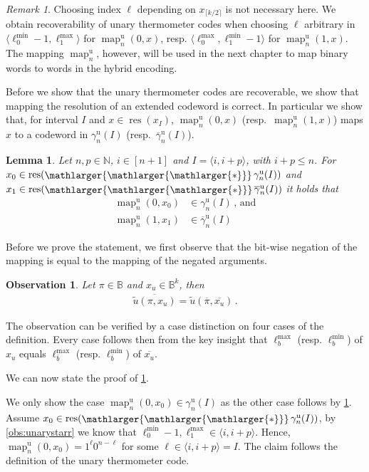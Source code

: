 \documentclass[9pt,journal,compsoc]{IEEEtran}
\newtheorem{lemma}[theorem]{Lemma}
\newtheorem{observation}[theorem]{Observation}
\theoremstyle{remark}
\newtheorem*{remark}{Remark}
\DeclareMathOperator{\res}{res}
\DeclareMathOperator{\map}{map}
\newcommand{\bigstarr}{\mathop{\raisebox{-.7pt}{\ensuremath{\mathlarger{\mathlarger{\mathlarger{*}}}}}}}
\newcommand{\IN}{\mathbb{N}}
\newcommand{\IB}{\mathbb{B}}
\newcommand{\ceil}[1]{\lceil{#1}\rceil}
\newcommand{\ang}[1]{\langle{#1}\rangle}
\newcommand{\intvl}[1]{\ang{#1}}
\newcommand{\gUnary}[1]{\gamma_{#1}^{\operatorname{u}}}
\newcommand{\gbUnary}[1]{\overline{\gamma}_{#1}^{\operatorname{u}}}
\newcommand{\mUnary}[1]{\map_{#1}^{\operatorname{u}}}
\newcommand{\lmax}[1]{\ell^{\max}_{#1}}
\newcommand{\lmin}[1]{\ell^{\min}_{#1}}
\begin{document}
\begin{remark}
  Choosing index $\ell$ depending on $x_{\ceil{k/2}}$ is not necessary here.
  We obtain recoverability of unary thermometer codes when choosing
    $\ell$ arbitrary in $\intvl{\lmin{0}-1,\lmax{1}}$ for $\mUnary{n}(0,x)$,
    resp. $\intvl{\lmax{0},\lmin{1}-1}$ for $\mUnary{n}(1,x)$.
  The mapping $\mUnary{n}$, however, will be used in the next chapter to map
    binary words to words in the hybrid encoding.
\end{remark}

Before we show that the unary thermometer codes are recoverable, 
  we show that mapping the resolution of an extended codeword is correct.
In particular we show that, for interval $I$ and $x\in\res(x_I)$, $\mUnary{n}(0,x)$ 
  (resp.\ $\mUnary{n}(1,x)$) maps $x$ to a codeword in $\gUnary{n}(I)$
  (resp.\ $\gbUnary{n}(I)$).

\begin{lemma}\label{lem:mapping}
  Let $n,p\in\IN$, $i\in[n+1]$ and $I=\intvl{i,i+p}$, with $i+p\leq n$.
  For $x_0\in\res(\bigstarr \gUnary{n}(I))$ 
  and $x_1\in\res(\bigstarr \gbUnary{n}(I))$ 
    it holds that
  \begin{align*}
    \mUnary{n}(0,x_0) &\in \gUnary{n}(I)\,\text{, and}\\
    \mUnary{n}(1,x_1) &\in \gbUnary{n}(I)
  \end{align*}
\end{lemma}
Before we prove the statement, we first observe that the bit-wise negation of the mapping is equal to the mapping of the negated arguments.

\begin{observation}\label{obs:neg_mapping}
  Let $\pi\in\IB$ and $x_u\in\IB^k$, then
  \begin{align*}
    \overline{\tilde{u}(\pi,x_u)}=\tilde{u}(\overline{\pi},\overline{x_u})\,.
  \end{align*}
\end{observation}
\begin{IEEEproof}
  The observation can be verified by a case distinction on four cases of the
  definition. Every case follows then from the key insight that $\ell_b^{\max}$
  (resp. $\ell_b^{\min}$) of $x_u$ equals $\ell_{\overline{b}}^{\max}$
  (resp. $\ell_{\overline{b}}^{\min}$) of ${\overline{x_u}}$.
\end{IEEEproof}

We can now state the proof of \cref{lem:mapping}.

\begin{IEEEproof}
  We only show the case $\mUnary{n}(0,x_0) \in \gUnary{n}(I)$
    as the other case follows by \cref{obs:neg_mapping}.
  Assume $x_0\in\res(\bigstarr \gUnary{n}(I))$, by \cref{obs:unarystarr}
    we know that $\lmin{0}-1,\lmax{1}\in\intvl{i,i+p}$.
  Hence, $\mUnary{n}(0,x_0)=1^\ell0^{n-\ell}$ for some
    $\ell\in\intvl{i,i+p}=I$.
  The claim follows the definition of the unary thermometer code.
\end{IEEEproof}
\end{document}
